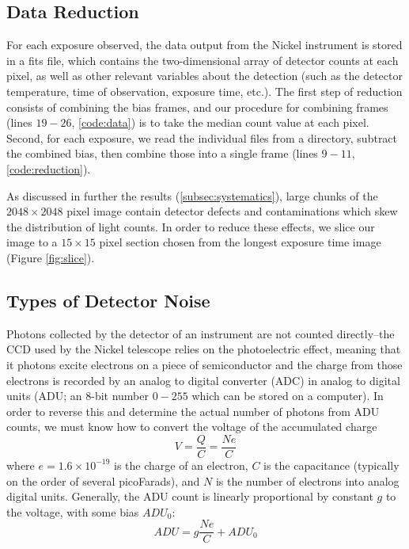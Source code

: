 \documentclass[preprint]{aastex62}
\begin{document}
\subsection{Data Reduction} \label{sec:reduction}
For each exposure observed, the data output from the Nickel instrument is stored in a fits file, which contains the two-dimensional array of detector counts at each pixel, as well as other relevant variables about the detection (such as the detector temperature, time of observation, exposure time, etc.). The first step of reduction consists of combining the bias frames, and our procedure for combining frames (lines $19-26$, \ref{code:data}) is to take the median count value at each pixel. Second, for each exposure, we read the individual files from a directory, subtract the combined bias, then combine those into a single frame (lines $9-11$, \ref{code:reduction}).

As discussed in further the results (\ref{subsec:systematics}), large chunks of the $2048\times2048$ pixel image contain detector defects and contaminations which skew the distribution of light counts. In order to reduce these effects, we slice our image to a $15\times15$ pixel section chosen from the longest exposure time image (Figure \ref{fig:slice}).

\subsection{Types of Detector Noise} \label{subsec:noise}
Photons collected by the detector of an instrument are not counted directly--the CCD used by the Nickel telescope relies on the photoelectric effect, meaning that it photons excite electrons on a piece of semiconductor and the charge from those electrons is recorded by an analog to digital converter (ADC) in analog to digital units (ADU; an 8-bit number $0-255$ which can be stored on a computer). In order to reverse this and determine the actual number of photons from ADU counts, we must know how to convert the voltage of the accumulated charge 
\begin{equation}
V = \frac{Q}{C} = \frac{Ne}{C}
\end{equation}
where $e=1.6\times10^{-19}$ is the charge of an electron, $C$ is the capacitance (typically on the order of several picoFarads), and $N$ is the number of electrons into analog digital units. Generally, the ADU count is linearly proportional by constant $g$ to the voltage, with some bias $ADU_0$:
\begin{equation}
ADU = g\frac{Ne}{C} + ADU_0
\end{equation}
\end{document}
